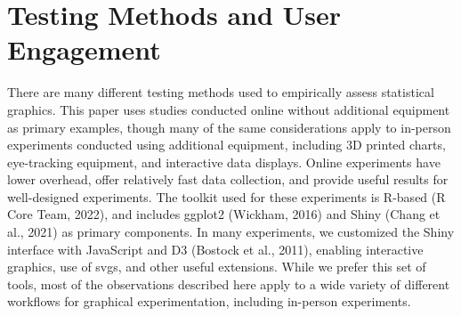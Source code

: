 \documentclass[
  10pt,
  letterpaper,
  DIV=11,
  numbers=noendperiod]{scrartcl}
\begin{document}
\section{Testing Methods and User Engagement}\label{sec-testing-methods}

There are many different testing methods used to empirically assess
statistical graphics. This paper uses studies conducted online without
additional equipment as primary examples, though many of the same
considerations apply to in-person experiments conducted using additional
equipment, including 3D printed charts, eye-tracking equipment, and
interactive data displays. Online experiments have lower overhead, offer
relatively fast data collection, and provide useful results for
well-designed experiments. The toolkit used for these experiments is
R-based (R Core Team, 2022), and includes ggplot2 (Wickham, 2016) and
Shiny (Chang et al., 2021) as primary components. In many experiments,
we customized the Shiny interface with JavaScript and D3 (Bostock et
al., 2011), enabling interactive graphics, use of svgs, and other useful
extensions. While we prefer this set of tools, most of the observations
described here apply to a wide variety of different workflows for
graphical experimentation, including in-person experiments.
\end{document}
